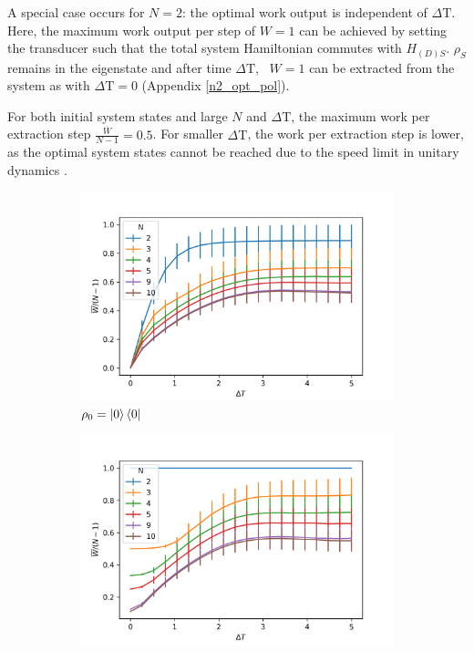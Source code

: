 A special case occurs for $N = 2$: the optimal work output is independent of $\Delta \mathrm{T}$.
Here, the maximum work output per step of $W = 1$ can be achieved by setting the transducer such that the total system Hamiltonian commutes with $H_{(D)S}$. $\rho_S$ remains in the eigenstate and after time $\Delta \mathrm{T}$, \ $W = 1$ can be extracted from the system as with $\Delta \mathrm{T} = 0$ (Appendix \ref{n2_opt_pol}).

For both initial system states and large $N$ and $\Delta \mathrm{T}$, the maximum work per extraction step $\frac{\overline{W}}{N-1} = 0.5$.
For smaller $\Delta \mathrm{T}$, the work per extraction step is lower, as the optimal system states cannot be reached due to the speed limit in unitary dynamics \cite{Deffner_2017, PhysRevA.67.052109}.

\begin{figure}[h]
	\centering
	\begin{subfigure}{0.4\textwidth}
		\centering
		\includegraphics[width=\textwidth]{img/dt_0}
		\caption{$\rho_0 = \ket{0}\bra{0}$}
		\label{dt_0}
	\end{subfigure}
	\begin{subfigure}{0.4\textwidth}
	\centering
	\includegraphics[width=\textwidth]{img/dt_eigen}

\end{subfigure}
\end{figure}
